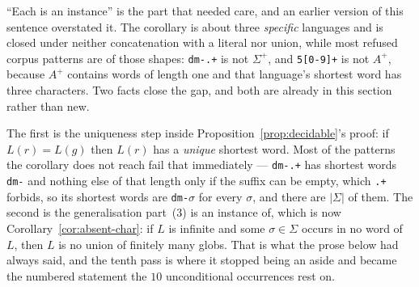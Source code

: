 \begin{remark}\label{rem:corollary-reach}
``Each is an instance'' is the part that needed care, and an earlier version of this
sentence overstated it. The corollary is about three \emph{specific} languages and is
closed under neither concatenation with a literal nor union, while most refused corpus
patterns are of those shapes: \texttt{dm-.+} is not $\Sigma^{+}$, and
\texttt{5[0-9]+} is not $A^{+}$, because $A^{+}$ contains words of length one and that
language's shortest word has three characters. Two facts close the gap, and both are
already in this section rather than new.

The first is the uniqueness step inside Proposition~\ref{prop:decidable}'s proof: if
$L(r)=L(g)$ then $L(r)$ has a \emph{unique} shortest word. Most of the patterns the
corollary does not reach fail that immediately --- \texttt{dm-.+} has shortest words
\texttt{dm-} and nothing else of that length only if the suffix can be empty, which
\texttt{.+} forbids, so its shortest words are \texttt{dm-}$\sigma$ for every $\sigma$,
and there are $|\Sigma|$ of them. The second is the generalisation part~(3) is an
instance of, which is now Corollary~\ref{cor:absent-char}: if $L$ is infinite and some
$\sigma\in\Sigma$ occurs in no word of $L$, then $L$ is no union of finitely many globs.
That is what the prose below had always said, and the tenth pass is where it stopped
being an aside and became the numbered statement the $10$ unconditional occurrences
rest on.
\end{remark}
